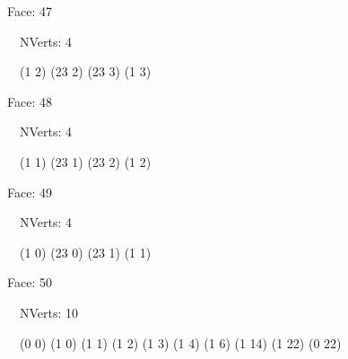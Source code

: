 \documentclass{article}
\begin{document}
{\footnotesize 

Face: 47

\   \    NVerts: 4

 \   \   (1 2) (23 2) (23 3) (1 3)}

{\footnotesize 

Face: 48

\   \    NVerts: 4

 \   \   (1 1) (23 1) (23 2) (1 2)}

{\footnotesize 

Face: 49

\   \    NVerts: 4

 \   \   (1 0) (23 0) (23 1) (1 1)}

{\footnotesize 

Face: 50

\   \    NVerts: 10

 \   \   (0 0) (1 0) (1 1) (1 2) (1 3) (1 4) (1 6) (1 14) (1 22) (0 22)}


 \newpage
\end{document}
